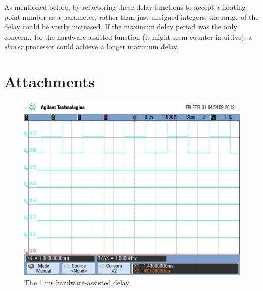 \documentclass[a4paper, 12pt]{article}
\begin{document}
As mentioned before, by refactoring these delay functions to accept a floating point number as a parameter, rather than just unsigned integers, the range of the delay could be vastly increased. If the maximum delay period was the only concern.. for the hardware-assisted function (it might seem counter-intuitive), a \textit{slower} processor could achieve a longer maximum delay. 

\section{Attachments}
\begin{figure}[htp]
\centering
\includegraphics[width=.8\textwidth]{1ms_hardware.png}
\caption{The 1 ms hardware-assisted delay}
\end{figure}
\end{document}
